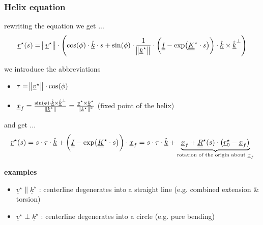 \begin{frame}
  \frametitle{Helix equation}

  rewriting the equation we get ...  %
  \begin{displaymath}
    \underline{r}^{\star}(s) = \norm[1]{\underline{v}^{\star}} \cdot \Biggl( \cos(\phi) \cdot \underline{\hat{k}} \cdot s + \sin(\phi) \cdot \frac{1}{\norm[1]{\underline{k}^{\star}}} \cdot \biggl( \underline{\underline{I}} - \exp \bigl( \underline{\underline{K}}^{\star} \cdot s \bigr) \biggr) \cdot \underline{\hat{k}} \times \underline{\hat{k}}^{\perp} \Biggr)
  \end{displaymath}
  
  \vspace{0.5em}
  we introduce the abbreviations
  \begin{itemize}
    \item $\tau = \norm[1]{\underline{v}^{\star}} \cdot \cos(\phi)$
    \item $\underline{x}_f = \frac{\sin(\phi) \cdot \underline{\hat{k}} \times \underline{\hat{k}}^{\perp}}{\norm[0]{\underline{k}^{\star}}} = \frac{\underline{v}^{\star} \times \underline{k}^{\star}}{\norm[0]{\underline{k}^{\star}}^2}$ (fixed point of the helix)
  \end{itemize}
  
  \vspace{0.7em}
  and get ...
  \begin{displaymath}
    \underline{r}^{\star}(s) = s \cdot \tau \cdot \underline{\hat{k}} + \biggl( \underline{\underline{I}} - \exp \bigl( \underline{\underline{K}}^{\star} \cdot s \bigr) \biggr) \cdot \underline{x}_f =
    s \cdot \tau \cdot \underline{\hat{k}} + \underbrace{ \underline{x}_f + \underline{\underline{R}}^{\star}(s) \cdot \bigl( \underline{r}^{\star}_0 - \underline{x}_f \bigr) }_{\text{rotation of the origin about }\underline{x}_f}
  \end{displaymath}
  
  \vspace{0.3em}
  \textbf{examples}
  \begin{itemize}
    \item $\underline{v}^{\star} \parallel \underline{k}^{\star}$ : 
      centerline degenerates into a straight line (e.g. combined extension \& torsion)
    \item $\underline{v}^{\star} \perp \underline{k}^{\star}$ : 
      centerline degenerates into a circle (e.g. pure bending)
  \end{itemize}
\end{frame}


